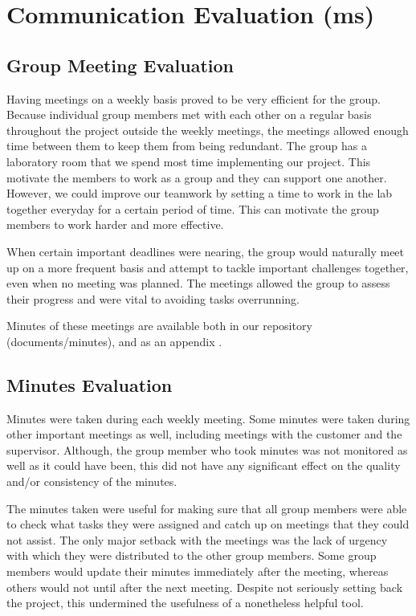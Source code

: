 \section{Communication Evaluation (ms)}
\label{evaluation communication}

\subsection{Group Meeting Evaluation}

Having meetings on a weekly basis proved to be very efficient
for the group. Because individual group members met with 
each other on a regular basis throughout the project outside
the weekly meetings, the meetings allowed enough time 
between them to keep them from being redundant.
The group has a laboratory room that we spend most time implementing our project.
This motivate the members to work as a group and they can support one another.
However, we could improve our teamwork by setting a time to work 
in the lab together everyday for a certain period of time. 
This can motivate the group members to work harder and more effective.

When certain important deadlines were nearing, the group
would naturally meet up on a more frequent basis and
attempt to tackle important challenges together, even when
no meeting was planned. The meetings allowed the group 
to assess their progress and were vital to avoiding tasks
overrunning.

Minutes of these meetings are available both in our repository \cite{github} 
(documents/minutes), and as an appendix \cite{chap:meeting_minutes}.


\subsection{Minutes Evaluation}

Minutes were taken during each weekly meeting. 
Some minutes were taken during other important meetings 
as well, including meetings with the customer and the 
supervisor. Although, the group member who took 
minutes was not monitored as well as it could have been, 
this did not have any significant effect on the quality 
and/or consistency of the minutes.

The minutes taken were useful for making sure that
all group members were able to check what tasks
they were assigned and catch up on meetings that they
could not assist. The only major setback with the meetings
was the lack of urgency with which they were distributed
to the other group members. Some group members would
update their minutes immediately after the meeting, whereas 
others would not until after the next meeting. Despite
not seriously setting back the project, this undermined the
usefulness of a nonetheless helpful tool.

